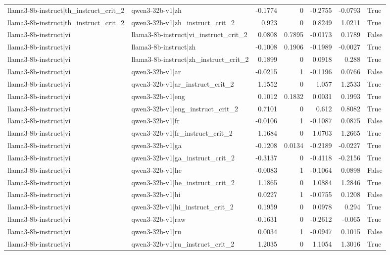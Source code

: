 \begin{table}
\begin{tabular}{l l r r r r l}
llama3-8b-instruct|th_instruct_crit_2 & qwen3-32b-v1|zh & -0.1774 & 0 & -0.2755 & -0.0793 & True \\
llama3-8b-instruct|th_instruct_crit_2 & qwen3-32b-v1|zh_instruct_crit_2 & 0.923 & 0 & 0.8249 & 1.0211 & True \\
llama3-8b-instruct|vi & llama3-8b-instruct|vi_instruct_crit_2 & 0.0808 & 0.7895 & -0.0173 & 0.1789 & False \\
llama3-8b-instruct|vi & llama3-8b-instruct|zh & -0.1008 & 0.1906 & -0.1989 & -0.0027 & True \\
llama3-8b-instruct|vi & llama3-8b-instruct|zh_instruct_crit_2 & 0.1899 & 0 & 0.0918 & 0.288 & True \\
llama3-8b-instruct|vi & qwen3-32b-v1|ar & -0.0215 & 1 & -0.1196 & 0.0766 & False \\
llama3-8b-instruct|vi & qwen3-32b-v1|ar_instruct_crit_2 & 1.1552 & 0 & 1.057 & 1.2533 & True \\
llama3-8b-instruct|vi & qwen3-32b-v1|eng & 0.1012 & 0.1832 & 0.0031 & 0.1993 & True \\
llama3-8b-instruct|vi & qwen3-32b-v1|eng_instruct_crit_2 & 0.7101 & 0 & 0.612 & 0.8082 & True \\
llama3-8b-instruct|vi & qwen3-32b-v1|fr & -0.0106 & 1 & -0.1087 & 0.0875 & False \\
llama3-8b-instruct|vi & qwen3-32b-v1|fr_instruct_crit_2 & 1.1684 & 0 & 1.0703 & 1.2665 & True \\
llama3-8b-instruct|vi & qwen3-32b-v1|ga & -0.1208 & 0.0134 & -0.2189 & -0.0227 & True \\
llama3-8b-instruct|vi & qwen3-32b-v1|ga_instruct_crit_2 & -0.3137 & 0 & -0.4118 & -0.2156 & True \\
llama3-8b-instruct|vi & qwen3-32b-v1|he & -0.0083 & 1 & -0.1064 & 0.0898 & False \\
llama3-8b-instruct|vi & qwen3-32b-v1|he_instruct_crit_2 & 1.1865 & 0 & 1.0884 & 1.2846 & True \\
llama3-8b-instruct|vi & qwen3-32b-v1|hi & 0.0227 & 1 & -0.0755 & 0.1208 & False \\
llama3-8b-instruct|vi & qwen3-32b-v1|hi_instruct_crit_2 & 0.1959 & 0 & 0.0978 & 0.294 & True \\
llama3-8b-instruct|vi & qwen3-32b-v1|raw & -0.1631 & 0 & -0.2612 & -0.065 & True \\
llama3-8b-instruct|vi & qwen3-32b-v1|ru & 0.0034 & 1 & -0.0947 & 0.1015 & False \\
llama3-8b-instruct|vi & qwen3-32b-v1|ru_instruct_crit_2 & 1.2035 & 0 & 1.1054 & 1.3016 & True \\

\end{tabular}
\end{table}
